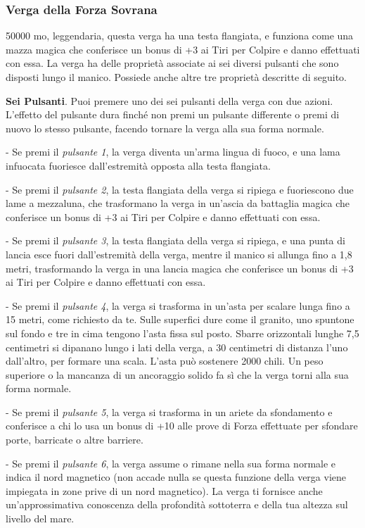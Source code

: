 \begin{multicols}{2}
	\subsubsection*{Verga della Forza Sovrana}
	50000 mo, leggendaria, questa verga ha una testa flangiata, e funziona come una mazza magica che conferisce un bonus di +3 ai Tiri per Colpire e danno effettuati con essa. La verga ha delle proprietà associate ai sei diversi pulsanti che sono disposti lungo il manico. Possiede anche altre tre proprietà descritte di seguito.

	\textbf{Sei Pulsanti}. Puoi premere uno dei sei pulsanti della verga con due azioni. L'effetto del pulsante dura finché non premi un pulsante differente o premi di nuovo lo stesso pulsante, facendo tornare la verga alla sua forma normale.

	- Se premi il \textit{pulsante 1}, la verga diventa un'arma lingua di fuoco, e una lama infuocata fuoriesce dall'estremità opposta alla testa flangiata.

	- Se premi il \textit{pulsante 2}, la testa flangiata della verga si ripiega e fuoriescono due lame a mezzaluna, che trasformano la verga in un'ascia da battaglia magica che conferisce un bonus di +3 ai Tiri per Colpire e danno effettuati con essa.

	- Se premi il \textit{pulsante 3}, la testa flangiata della verga si ripiega, e una punta di lancia esce fuori dall'estremità della verga, mentre il manico si allunga fino a 1,8 metri, trasformando la verga in una lancia magica che conferisce un bonus di +3 ai Tiri per Colpire e danno effettuati con essa.

	- Se premi il \textit{pulsante 4}, la verga si trasforma in un'asta per scalare lunga fino a 15 metri, come richiesto da te. Sulle superfici dure come il granito, uno spuntone sul fondo e tre in cima tengono l'asta fissa sul posto. Sbarre orizzontali lunghe 7,5 centimetri si dipanano lungo i lati della verga, a 30 centimetri di distanza l'uno dall'altro, per formare una scala. L'asta può sostenere 2000 chili. Un peso superiore o la mancanza di un ancoraggio solido fa sì che la verga torni alla sua forma normale.

	- Se premi il \textit{pulsante 5}, la verga si trasforma in un ariete da sfondamento e conferisce a chi lo usa un bonus di +10 alle prove di Forza effettuate per sfondare porte, barricate o altre barriere.

	- Se premi il \textit{pulsante 6}, la verga assume o rimane nella sua forma normale e indica il nord magnetico (non accade nulla se questa funzione della verga viene impiegata in zone prive di un nord magnetico). La verga ti fornisce anche un'approssimativa conoscenza della profondità sottoterra e della tua altezza sul livello del mare.


\end{multicols}

